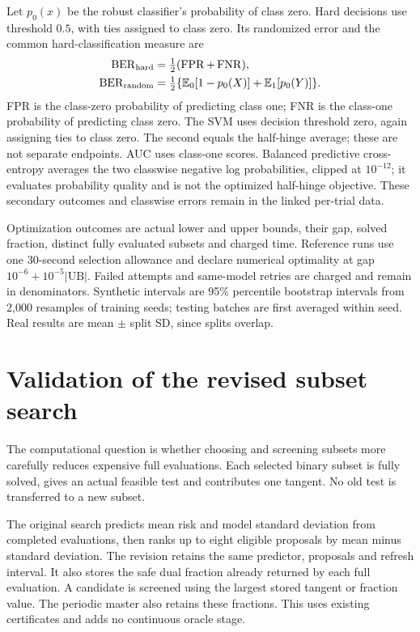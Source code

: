 \documentclass[11pt,a4paper]{article}
\begin{document}
Let $p_0(x)$ be the robust classifier's probability of class zero. Hard decisions
use threshold $0.5$, with ties assigned to class zero. Its randomized error and
the common hard-classification measure are
\begin{equation}\label{eq:errors}
\begin{aligned}
\operatorname{BER}_{\rm hard}&=\tfrac12(\operatorname{FPR}+\operatorname{FNR}),\\
\operatorname{BER}_{\rm random}&=\tfrac12\{\mathbb E_0[1-p_0(X)]+\mathbb E_1[p_0(Y)]\}.
\end{aligned}
\end{equation}
FPR is the class-zero probability of predicting class one; FNR is the
class-one probability of predicting class zero. The SVM uses decision threshold
zero, again assigning ties to class zero.
The second equals the half-hinge average; these are not separate endpoints.
AUC uses class-one scores. Balanced predictive cross-entropy averages the two
classwise negative log probabilities, clipped at $10^{-12}$; it evaluates
probability quality and is not the optimized half-hinge objective. These secondary
outcomes and classwise errors remain in the linked per-trial data.

Optimization outcomes are actual lower and upper bounds, their gap, solved
fraction, distinct fully evaluated subsets and charged time. Reference runs use
one 30-second selection allowance and declare numerical optimality at gap
$10^{-6}+10^{-5}|\mathrm{UB}|$. Failed attempts and same-model retries are charged
and remain in denominators. Synthetic intervals are 95\% percentile bootstrap
intervals from 2,000 resamples of training seeds; testing batches are first
averaged within seed. Real results are mean $\pm$ split SD, since splits overlap.

\section{Validation of the revised subset search}\label{sec:search}
The computational question is whether choosing and screening subsets more carefully reduces expensive full evaluations. Each selected binary subset is fully solved, gives an actual feasible test and contributes one tangent. No old test is transferred to a new subset.

The original search predicts mean risk and model standard deviation from completed evaluations, then ranks up to eight eligible proposals by mean minus standard deviation. The revision retains the same predictor, proposals and refresh interval. It also stores the safe dual fraction already returned by each full evaluation. A candidate is screened using the largest stored tangent or fraction value. The periodic master also retains these fractions. This uses existing certificates and adds no continuous oracle stage.
\end{document}
